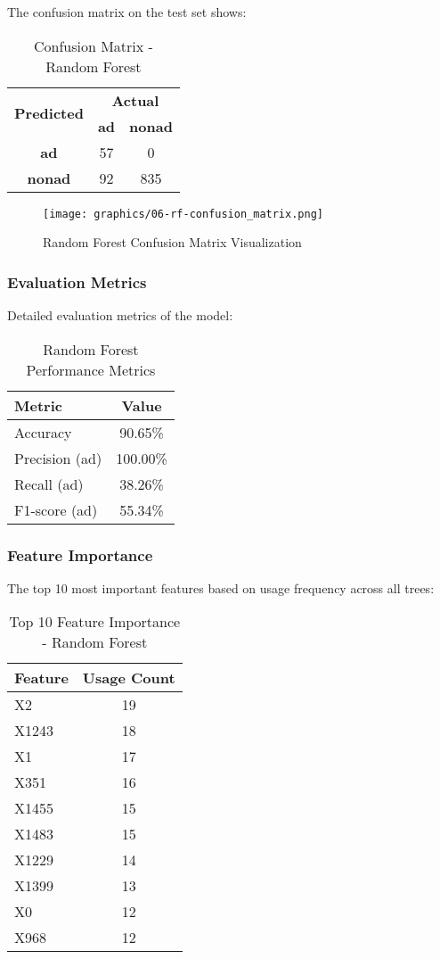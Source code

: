 The confusion matrix on the test set shows:

\begin{table}[h]
\centering
\caption{Confusion Matrix - Random Forest}
\begin{tabular}{|c|c|c|}
\hline
\multirow{2}{*}{\textbf{Predicted}} & \multicolumn{2}{c|}{\textbf{Actual}} \\
\cline{2-3}
 & \textbf{ad} & \textbf{nonad} \\
\hline
\textbf{ad} & 57 & 0 \\
\hline
\textbf{nonad} & 92 & 835 \\
\hline
\end{tabular}
\end{table}

\begin{figure}[h]
\centering
\texttt{[image: graphics/06-rf-confusion\_matrix.png]}
\caption{Random Forest Confusion Matrix Visualization}
\end{figure}

\subsubsection{Evaluation Metrics}

Detailed evaluation metrics of the model:

\begin{table}[h]
\centering
\caption{Random Forest Performance Metrics}
\begin{tabular}{|l|c|}
\hline
\textbf{Metric} & \textbf{Value} \\
\hline
Accuracy & 90.65\% \\
Precision (ad) & 100.00\% \\
Recall (ad) & 38.26\% \\
F1-score (ad) & 55.34\% \\
\hline
\end{tabular}
\end{table}

\subsubsection{Feature Importance}

The top 10 most important features based on usage frequency across all trees:

\begin{table}[h]
\centering
\caption{Top 10 Feature Importance - Random Forest}
\begin{tabular}{|l|c|}
\hline
\textbf{Feature} & \textbf{Usage Count} \\
\hline
X2 & 19 \\
X1243 & 18 \\
X1 & 17 \\
X351 & 16 \\
X1455 & 15 \\
X1483 & 15 \\
X1229 & 14 \\
X1399 & 13 \\
X0 & 12 \\
X968 & 12 \\
\hline
\end{tabular}
\end{table}

